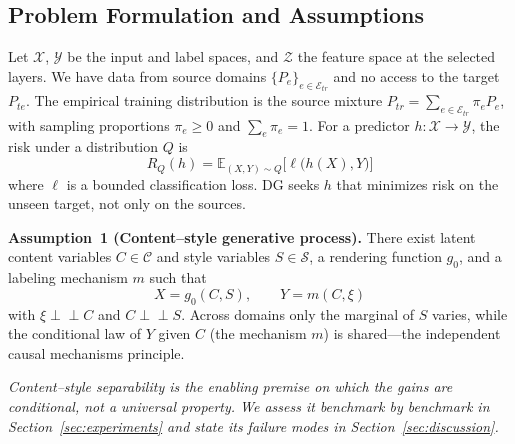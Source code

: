 \documentclass[electronics,article,submit,moreauthors]{Definitions/mdpi}
\begin{document}
\subsection{Problem Formulation and Assumptions}

Let $\mathcal{X}$, $\mathcal{Y}$ be the input and label spaces, and $\mathcal{Z}$ the feature space at the selected layers. We have data from source domains $\{P_e\}_{e\in\mathcal{E}_{tr}}$ and no access to the target $P_{te}$. The empirical training distribution is the source mixture $P_{tr}=\sum_{e\in\mathcal{E}_{tr}}\pi_e P_e$, with sampling proportions $\pi_e\ge0$ and $\sum_e\pi_e=1$. For a predictor $h:\mathcal{X}\to\mathcal{Y}$, the risk under a distribution $Q$ is
\begin{equation}
R_Q(h)=\mathbb{E}_{(X,Y)\sim Q}\big[\ell\big(h(X),Y\big)\big]
\end{equation}
where $\ell$ is a bounded classification loss. DG seeks $h$ that minimizes risk on the unseen target, not only on the sources.

\noindent\textbf{Assumption~1 (Content--style generative process).} There exist latent content variables $C\in\mathcal{C}$ and style variables $S\in\mathcal{S}$, a rendering function $g_0$, and a labeling mechanism $m$ such that
\begin{equation}
X=g_0(C,S),\qquad Y=m(C,\xi)
\end{equation}
with $\xi\perp\!\!\!\perp C$ and $C\perp\!\!\!\perp S$. Across domains only the marginal of $S$ varies, while the conditional law of $Y$ given $C$ (the mechanism $m$) is shared---the independent causal mechanisms principle.

\noindent\textit{Content--style separability is the enabling premise on which the gains are conditional, not a universal property. We assess it benchmark by benchmark in Section~\ref{sec:experiments} and state its failure modes in Section~\ref{sec:discussion}.}
\end{document}
